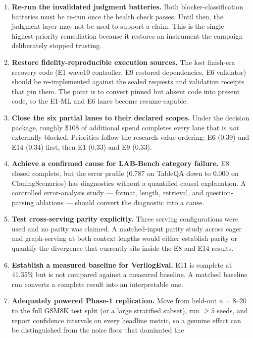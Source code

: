 \begin{enumerate}[leftmargin=1.6em,itemsep=3pt]
  \item \textbf{Re-run the invalidated judgment batteries.} Both
  blocker-classification batteries must be re-run once the health check passes.
  Until then, the judgment layer may not be used to support a claim. This is the
  single highest-priority remediation because it restores an instrument the
  campaign deliberately stopped trusting.
  \item \textbf{Restore fidelity-reproducible execution sources.} The lost
  finish-era recovery code (E1 wave10 controller, E9 restored dependencies, E6
  validator) should be re-implemented against the sealed requests and validation
  receipts that pin them. The point is to convert pinned but absent code into
  present code, so the E1-ML and E6 lanes become resume-capable.
  \item \textbf{Close the six partial lanes to their declared scopes.} Under the
  decision package, roughly \$108 of additional spend completes every lane that is
  \emph{not} externally blocked. Priorities follow the research-value ordering:
  E6 (0.39) and E14 (0.34) first, then E1 (0.33) and E9 (0.33).
  \item \textbf{Achieve a confirmed cause for LAB-Bench category failure.} E8
  closed complete, but the error profile (0.787 on TableQA down to 0.000 on
  CloningScenarios) has diagnostics without a quantified causal explanation. A
  controlled error-analysis study --- format, length, retrieval, and
  question-parsing ablations --- should convert the diagnostic into a cause.
  \item \textbf{Test cross-serving parity explicitly.} Three serving
  configurations were used and no parity was claimed. A matched-input parity study
  across eager and graph-serving at both context lengths would either establish
  parity or quantify the divergence that currently sits inside the E8 and E14
  results.
  \item \textbf{Establish a measured baseline for VerilogEval.} E11 is complete at
  41.35\% but is not compared against a measured baseline. A matched baseline run
  converts a complete result into an interpretable one.
  \item \textbf{Adequately powered Phase-1 replication.} Move from held-out
  $n=8$--$20$ to the full GSM8K test split (or a large stratified subset), run
  $\ge 5$ seeds, and report confidence intervals on every headline metric, so a
  genuine effect can be distinguished from the noise floor that dominated the

\end{enumerate}
